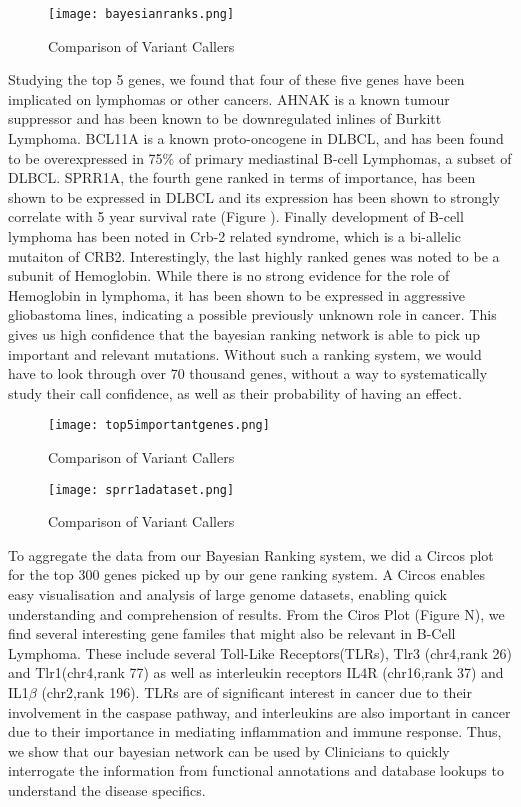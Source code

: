 \documentclass{article}
\begin{document}
\begin{figure}[H]
\texttt{[image: bayesianranks.png]}
\caption{Comparison of Variant Callers}
\centering
\end{figure}

Studying the top 5 genes, we found that four of these five genes have been implicated on lymphomas or other cancers. AHNAK is a known tumour suppressor and has been known to be downregulated inlines of Burkitt Lymphoma. BCL11A is a known proto-oncogene in DLBCL, and has been found to be overexpressed in 75\% of primary mediastinal B-cell Lymphomas, a subset of DLBCL. SPRR1A, the fourth gene ranked in terms of importance, has been shown to be expressed in DLBCL and its expression has been shown to strongly correlate with 5 year survival rate (Figure ). Finally development of B-cell lymphoma has been noted in Crb-2 related syndrome, which is a bi-allelic mutaiton of CRB2. Interestingly, the last highly ranked genes was noted to be a subunit of Hemoglobin. While there is no strong evidence for the role of Hemoglobin in lymphoma, it has been shown to be expressed in aggressive gliobastoma lines, indicating a possible previously unknown role in cancer. This gives us high confidence that the bayesian ranking network is able to pick up important and relevant mutations. Without such a ranking system, we would have to look through over 70 thousand genes, without a way to systematically study their call confidence, as well as their probability of having an effect. 


\begin{figure}[H]
\texttt{[image: top5importantgenes.png]}
\caption{Comparison of Variant Callers}
\centering
\end{figure}

\begin{figure}[H]
\texttt{[image: sprr1adataset.png]}
\caption{Comparison of Variant Callers}
\centering
\end{figure}


To aggregate the data from our Bayesian Ranking system, we did a Circos plot for the top 300 genes picked up by our gene ranking system. A Circos enables easy visualisation and analysis of large genome datasets, enabling quick understanding and comprehension of results. From the Ciros Plot (Figure N), we find several interesting gene familes that might also be relevant in B-Cell Lymphoma. These include several Toll-Like Receptors(TLRs), Tlr3 (chr4,rank 26) and Tlr1(chr4,rank 77) as well as interleukin receptors IL4R (chr16,rank 37) and IL1$\beta$ (chr2,rank 196). TLRs are of significant interest in cancer due to their involvement in the caspase pathway, and interleukins are also important in cancer due to their importance in mediating inflammation and immune response. Thus, we show that our bayesian network can be used by Clinicians to quickly interrogate the information from functional annotations and database lookups to understand the disease specifics. 
\end{document}
